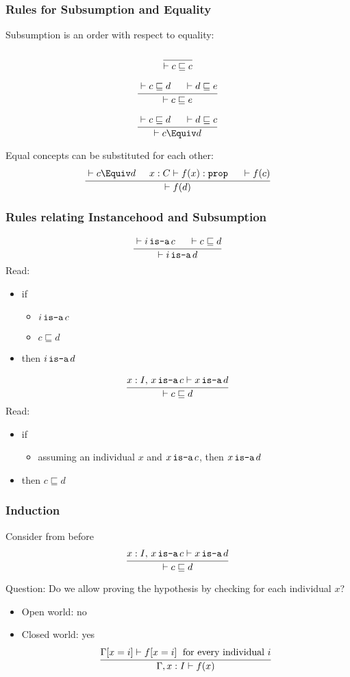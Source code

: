 \begin{frame}\frametitle{Rules for Subsumption and Equality}
Subsumption is an order with respect to equality:
\[\cfrac{}{\vdash c\sqsubseteq c}\,\]

\[\cfrac{\vdash c\sqsubseteq d \hspace*{.5cm} \vdash d\sqsubseteq e}{\vdash c\sqsubseteq e}\,\]

\[\rul{\vdash c\sqsubseteq d \tb \vdash d\sqsubseteq c}{\vdash c\Equiv d}\]

Equal concepts can be substituted for each other:
\[\rul{\vdash c\Equiv d\tb x:C\vdash f(x):\prop \tb \vdash f(c)}{\vdash f(d)}\]

\end{frame}

\begin{frame}\frametitle{Rules relating Instancehood and Subsumption}
\[\cfrac{\vdash i\mathop{\texttt{is-a}} c \hspace*{.5cm} \vdash c\sqsubseteq d}{\vdash i\mathop{\texttt{is-a}} d}\,\]
Read:
\begin{itemize}
\item if
 \begin{itemize}
 \item $i\mathop{\texttt{is-a}} c$
 \item $c\sqsubseteq d$
 \end{itemize}
\item then $i\mathop{\texttt{is-a}} d$
\end{itemize}

\[\cfrac{x:I,\,x\mathop{\texttt{is-a}} c\vdash x\mathop{\texttt{is-a}} d}{\vdash c\sqsubseteq d}\,\]
Read:
\begin{itemize}
\item if
 \begin{itemize}
 \item assuming an individual $x$ and $x\mathop{\texttt{is-a}} c$, then $x\mathop{\texttt{is-a}} d$
 \end{itemize}
\item then $c\sqsubseteq d$
\end{itemize}
\end{frame}

\begin{frame}\frametitle{Induction}
Consider from before
\[\cfrac{x:I,\,x\mathop{\texttt{is-a}} c\vdash x\mathop{\texttt{is-a}} d}{\vdash c\sqsubseteq d}\,\]

Question: Do we allow proving the hypothesis by checking for each individual $x$?
\begin{itemize}
\item<2-> Open world: no
\item<3-> Closed world: yes
 \[\cfrac{\Gamma[x=i]\vdash f[x=i] \;\text{ for every individual } i}{\Gamma, x:I\vdash f(x)}\,\]
\end{itemize}
\end{frame}


